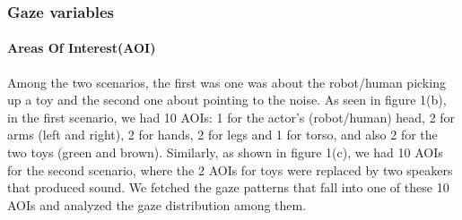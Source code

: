\documentclass{acm_proc_article-sp}
\begin{document}
\subsubsection{Gaze variables}

\paragraph{Areas Of Interest(AOI)}

Among the two scenarios, the first was one was about the robot/human picking up
a toy and the second one about pointing to the noise. As seen in figure 1(b), in
the first scenario, we had 10 AOIs: 1 for the actor's (robot/human) head, 2 for
arms (left and right), 2 for hands, 2 for legs and 1 for torso, and also 2 for
the two toys (green and brown). Similarly, as shown in figure 1(c), we had 10
AOIs for the second scenario, where the 2 AOIs for toys were replaced by two
speakers that produced sound. We fetched the gaze patterns that fall into one of
these 10 AOIs and analyzed the gaze distribution among them.
\end{document}

